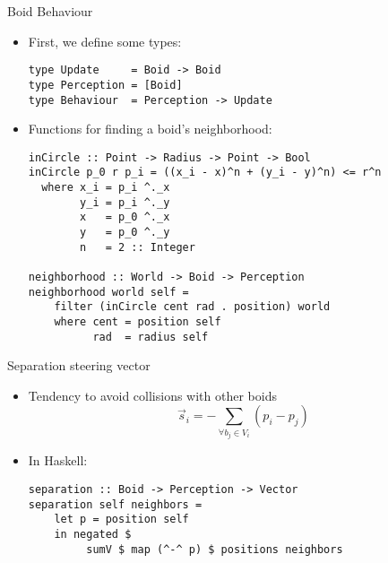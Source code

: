 \documentclass{beamer}
\begin{document}
\begin{frame}[fragile]
    \huge{Boid Behaviour}\normalsize
    \begin{itemize}
        \item First, we define some types:
        \begin{verbatim}
type Update     = Boid -> Boid
type Perception = [Boid]
type Behaviour  = Perception -> Update
        \end{verbatim}
        \item<2-> Functions for finding a boid's neighborhood:
        \begin{verbatim}
inCircle :: Point -> Radius -> Point -> Bool
inCircle p_0 r p_i = ((x_i - x)^n + (y_i - y)^n) <= r^n
  where x_i = p_i ^._x
        y_i = p_i ^._y
        x   = p_0 ^._x
        y   = p_0 ^._y
        n   = 2 :: Integer

neighborhood :: World -> Boid -> Perception
neighborhood world self =
    filter (inCircle cent rad . position) world
    where cent = position self
          rad  = radius self
    \end{verbatim}
    \end{itemize}
\end{frame}

\begin{frame}[fragile]
    \huge{Separation steering vector}\normalsize
    \begin{itemize}

    \item Tendency to avoid collisions with other boids
        \begin{equation*}
    \vec{s}_i = - \sum\limits_{\forall b_j \in V_i} (p_i - p_j)
    \end{equation*}
    \item<2-> In Haskell:
    \begin{verbatim}
separation :: Boid -> Perception -> Vector
separation self neighbors =
    let p = position self
    in negated $
         sumV $ map (^-^ p) $ positions neighbors
\end{verbatim}
    \end{itemize}


\end{frame}
\end{document}
